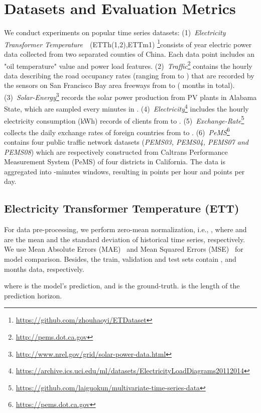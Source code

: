\documentclass{article}
\begin{document}
\section{Datasets and Evaluation Metrics}
\label{sec:Evaluation}

We conduct experiments on  popular time series datasets: (1)~\emph{Electricity Transformer Temperature}~\citep{Zhou2020InformerBE}~(ETTh(1,2),ETTm1) \footnote{\url{https://github.com/zhouhaoyi/ETDataset}}consists of  year electric power data collected from two separated counties of China. Each data point includes an "oil temperature" value and  power load features.
(2)~\emph{Traffic}\footnote{\url{http://pems.dot.ca.gov}} contains the hourly data describing the road occupancy rates (ranging from  to ) that are recorded by the sensors on San Francisco Bay area freeways from  to  ( months in total). 
(3)~\emph{Solar-Energy}\footnote{\url{http://www.nrel.gov/grid/solar-power-data.html}} records the solar power production from  PV plants in Alabama State, which are sampled every  minutes in .
(4)~\emph{Electricity}\footnote{\url{https://archive.ics.uci.edu/ml/datasets/ElectricityLoadDiagrams20112014}} includes the hourly electricity consumption (kWh) records of  clients from  to .
(5)~\emph{Exchange-Rate}\footnote{\url{https://github.com/laiguokun/multivariate-time-series-data}} collects the daily exchange rates of  foreign countries from  to .
(6)~\textit{PeMS}\footnote{\url{https://pems.dot.ca.gov}} contains four public traffic network datasets (\emph{PEMS03, PEMS04, PEMS07 and PEMS08}) which are respectively constructed from Caltrans Performance Measurement System (PeMS) of four districts in California. The data is aggregated into -minutes windows, resulting in  points per hour and  points per day. 

\subsection{Electricity Transformer Temperature (ETT)}



For data pre-processing, we perform zero-mean normalization, i.e., , where  and  are the mean and the standard deviation of historical time series, respectively.
We use Mean Absolute Errors (MAE)~\citep{Hyndman2006AnotherLA} and Mean Squared Errors (MSE)~\citep{Makridakis1982TheAO} for model comparison. Besides, the train, validation and test sets contain ,  and  months data, respectively. 


where  is the model's prediction, and  is the ground-truth.  is  the length of the prediction horizon.
\end{document}

